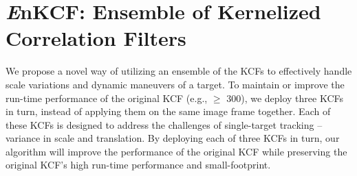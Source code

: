 \documentclass[10pt,twocolumn,letterpaper]{article}
\begin{document}
\section{{\it E}nKCF: Ensemble of Kernelized Correlation Filters}
We propose a novel way of utilizing an ensemble of the KCFs
\cite{henriques2015high} to effectively handle scale variations and
dynamic maneuvers of a target. To maintain or improve the run-time
performance of the original KCF (e.g., $\ge$ 300), we deploy three
KCFs in turn, instead of applying them on the same image frame
together. Each of these KCFs is designed to address the challenges of
single-target tracking -- variance in scale and translation. By
deploying each of three KCFs in turn, our algorithm will improve the
performance of the original KCF while preserving the original KCF's
high run-time performance and small-footprint.
\end{document}
